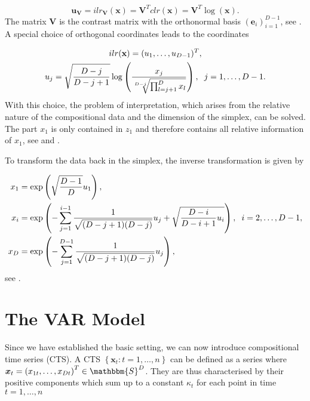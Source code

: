 \begin{equation}
\textbf{u}_{\textbf{V}} = ilr_{\textbf{V}}(\textbf{x}) = \textbf{V}^T clr(\textbf{x}) = \textbf{V}^T \log(\textbf{x}). 
\label{eq:ilr coordinates with V}
\end{equation}
%
The matrix $\textbf{V}$ is the contrast matrix with the orthonormal basis $(\textbf{e}_i)_{i=1}^{D-1}$, see \textcite{Egozcue:2003}. A special choice of orthogonal coordinates leads to the coordinates 

\begin{equation}
\begin{gathered}
ilr(\textbf{x}) = (u_1,\ldots,u_{D-1})^T, \\
u_j = \sqrt{\frac{D-j}{D-j+1}}\log\left(\frac{x_j}{\sqrt[D-j]{\prod_{l=j+1}^D x_l}}\right), \hspace{0.2cm} j=1,\ldots, D-1.
\label{eq:pivot coordinates}
\end{gathered}
\end{equation}
%
With this choice, the problem of interpretation, which arises from the relative nature of the compositional data and the dimension of the simplex, can be solved. The part $x_1$ is only contained in $z_1$ and therefore contains all relative information of $x_1$, see \textcite{Kynclova:2015} and \textcite{Filzmoser:2020}. 

To transform the data back in the simplex, the inverse transformation is given by 

\begin{align}
x_1 &= \exp\left(\sqrt{\frac{D-1}{D}}u_1\right), \\
x_i &= \exp\left(- \sum_{j=1}^{i-1}\frac{1}{\sqrt{(D-j+1)(D-j)}}u_j + \sqrt{\frac{D-i}{D-i+1}u_i} \right), \hspace{0.2cm} i=2,\ldots, D-1, \\
x_D &= \exp\left(- \sum_{j=1}^{D-1} \frac{1}{\sqrt{(D-j+1)(D-j)}}u_j \right),
\label{eq: Inverse Transformation}
\end{align}
see \textcite{Kynclova:2015}. 

\section{The VAR Model}
\label{sec:The VAR Model}

Since we have established the basic setting, we can now introduce compositional time series (CTS). A CTS $\left\{\bm{x}_t:t=1,\ldots,n \right\}$ can be defined as a series where $\bm{x}_t = \left(x_{1t},\ldots,x_{Dt}\right)^T \in \mathbbm{S}^D$. They are thus characterised by their positive components which sum up to a constant $\kappa_t$ for each point in time $t=1,\ldots,n$ 

